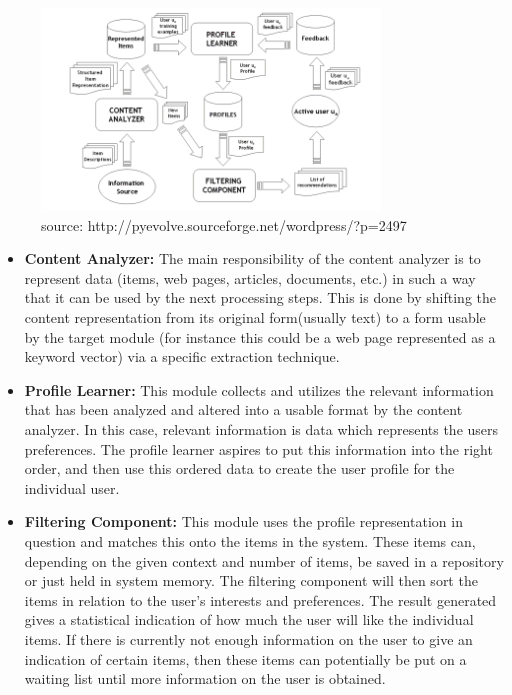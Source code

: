 \begin{figure}[H]
\centering
\includegraphics[width=90mm]{Pictures/contentdescription.png}
\caption{source: http://pyevolve.sourceforge.net/wordpress/?p=2497}
\label{contentdescription}
\end{figure}
\begin{itemize}
	\item \textbf{Content Analyzer:}
	The main responsibility of the content analyzer is to represent data (items, web pages, articles, documents, etc.) in such a way that it can be used by the next processing steps. This is done by shifting the content representation from its original form(usually text) to a form usable by the target module (for instance this could be a web page represented as a keyword vector) via a specific extraction technique.
	
	\item \textbf{Profile Learner:} This module collects and utilizes the relevant information that has been analyzed and altered into a usable format by the content analyzer. In this case, relevant information is data which represents the users preferences. The profile learner aspires to put this information into the right order, and then use this ordered data to create the user profile for the individual user.
	
	\item \textbf{Filtering Component:} This module uses the profile representation in question and matches this onto the items in the system. These items can, depending on the given context and number of items, be saved in a repository or just held in system memory. The filtering component will then sort the items in relation to the user's interests and preferences.\newline
	The result generated gives a statistical indication of how much the user will like the individual items. If there is currently not enough information on the user to give an indication of certain items, then these items can potentially be put on a waiting list until more information on the user is obtained.
\end{itemize}

